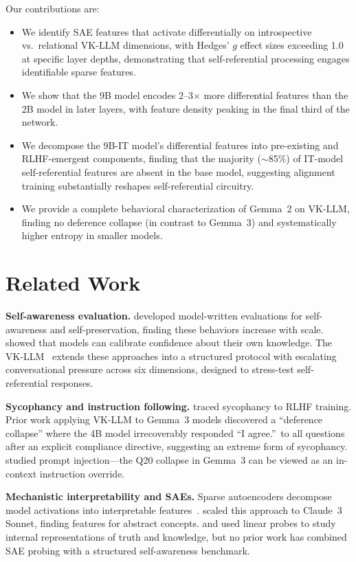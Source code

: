 \documentclass{article}
\begin{document}
Our contributions are:
\begin{itemize}
    \item We identify SAE features that activate differentially on introspective vs.\ relational VK-LLM dimensions, with Hedges' $g$ effect sizes exceeding 1.0 at specific layer depths, demonstrating that self-referential processing engages identifiable sparse features.
    \item We show that the 9B model encodes 2--3$\times$ more differential features than the 2B model in later layers, with feature density peaking in the final third of the network.
    \item We decompose the 9B-IT model's differential features into pre-existing and RLHF-emergent components, finding that the majority ($\sim$85\%) of IT-model self-referential features are absent in the base model, suggesting alignment training substantially reshapes self-referential circuitry.
    \item We provide a complete behavioral characterization of Gemma~2 on VK-LLM, finding no deference collapse (in contrast to Gemma~3) and systematically higher entropy in smaller models.
\end{itemize}


\section{Related Work}
\label{sec:related}

\textbf{Self-awareness evaluation.}
\citet{perez2023discovering} developed model-written evaluations for self-awareness and self-preservation, finding these behaviors increase with scale.
\citet{kadavath2022language} showed that models can calibrate confidence about their own knowledge.
The VK-LLM~\citep{nobregamedeiros2026vkllm} extends these approaches into a structured protocol with escalating conversational pressure across six dimensions, designed to stress-test self-referential responses.

\textbf{Sycophancy and instruction following.}
\citet{sharma2024towards} traced sycophancy to RLHF training.
Prior work applying VK-LLM to Gemma~3 models discovered a ``deference collapse'' where the 4B model irrecoverably responded ``I agree.''\ to all questions after an explicit compliance directive, suggesting an extreme form of sycophancy.
\citet{greshake2023not} studied prompt injection---the Q20 collapse in Gemma~3 can be viewed as an in-context instruction override.

\textbf{Mechanistic interpretability and SAEs.}
Sparse autoencoders decompose model activations into interpretable features~\citep{cunningham2023sparse,bricken2023monosemanticity}.
\citet{templeton2024scaling} scaled this approach to Claude~3 Sonnet, finding features for abstract concepts.
\citet{burns2023discovering} and \citet{li2024inference} used linear probes to study internal representations of truth and knowledge, but no prior work has combined SAE probing with a structured self-awareness benchmark.
\end{document}
